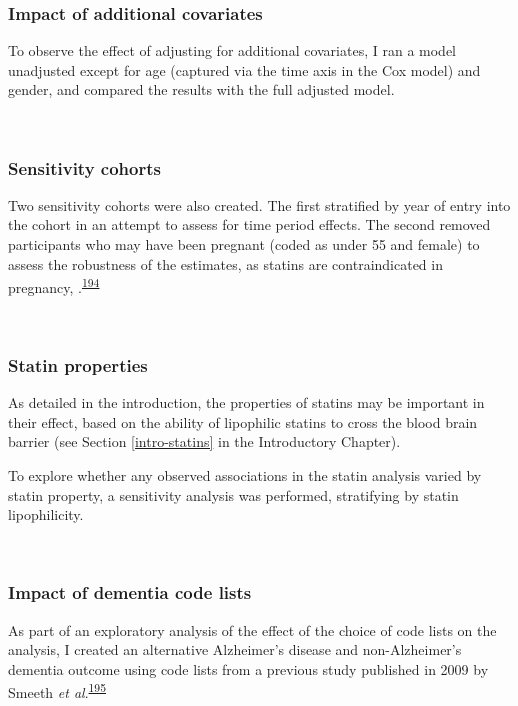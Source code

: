 \documentclass[a4paper, twoside]{templates/ociamthesis}
\begin{document}
\hypertarget{impact-of-additional-covariates}{%
\subsubsection{Impact of additional covariates}\label{impact-of-additional-covariates}}

To observe the effect of adjusting for additional covariates, I ran a model unadjusted except for age (captured via the time axis in the Cox model) and gender, and compared the results with the full adjusted model.

~

\hypertarget{sensitivity-cohorts}{%
\subsubsection{Sensitivity cohorts}\label{sensitivity-cohorts}}

Two sensitivity cohorts were also created. The first stratified by year of entry into the cohort in an attempt to assess for time period effects. The second removed participants who may have been pregnant (coded as under 55 and female) to assess the robustness of the estimates, as statins are contraindicated in pregnancy, .\textsuperscript{\protect\hyperlink{ref-karalis2016}{194}}

~

\hypertarget{statin-properties}{%
\subsubsection{Statin properties}\label{statin-properties}}

As detailed in the introduction, the properties of statins may be important in their effect, based on the ability of lipophilic statins to cross the blood brain barrier (see Section \ref{intro-statins} in the Introductory Chapter).

To explore whether any observed associations in the statin analysis varied by statin property, a sensitivity analysis was performed, stratifying by statin lipophilicity.

~

\hypertarget{impact-of-dementia-code-lists}{%
\subsubsection{Impact of dementia code lists}\label{impact-of-dementia-code-lists}}

As part of an exploratory analysis of the effect of the choice of code lists on the analysis, I created an alternative Alzheimer's disease and non-Alzheimer's dementia outcome using code lists from a previous study published in 2009 by Smeeth \emph{et al}.\textsuperscript{\protect\hyperlink{ref-smeeth2009}{195}}
\end{document}
